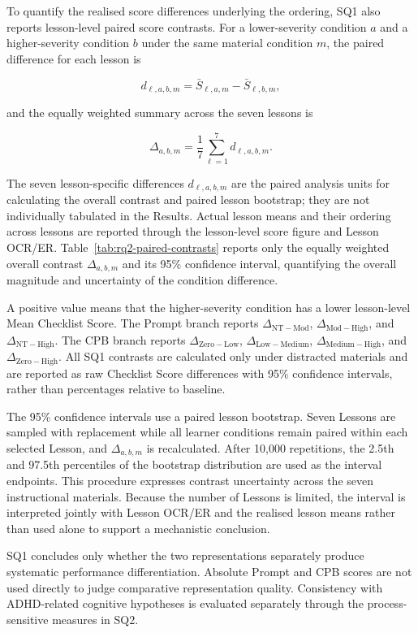 To quantify the realised score differences underlying the ordering, SQ1 also reports lesson-level paired score contrasts. For a lower-severity condition $a$ and a higher-severity condition $b$ under the same material condition $m$, the paired difference for each lesson is

\[
d_{\ell,a,b,m}
=
\bar S_{\ell,a,m}
-
\bar S_{\ell,b,m},
\]

and the equally weighted summary across the seven lessons is

\[
\Delta_{a,b,m}
=
\frac{1}{7}
\sum_{\ell=1}^{7}
d_{\ell,a,b,m}.
\]

The seven lesson-specific differences $d_{\ell,a,b,m}$ are the paired analysis units for calculating the overall contrast and paired lesson bootstrap; they are not individually tabulated in the Results. Actual lesson means and their ordering across lessons are reported through the lesson-level score figure and Lesson OCR/ER. Table~\ref{tab:rq2-paired-contrasts} reports only the equally weighted overall contrast $\Delta_{a,b,m}$ and its 95\% confidence interval, quantifying the overall magnitude and uncertainty of the condition difference.

A positive value means that the higher-severity condition has a lower lesson-level Mean Checklist Score. The Prompt branch reports $\Delta_{\mathrm{NT-Mod}}$, $\Delta_{\mathrm{Mod-High}}$, and $\Delta_{\mathrm{NT-High}}$. The CPB branch reports $\Delta_{\mathrm{Zero-Low}}$, $\Delta_{\mathrm{Low-Medium}}$, $\Delta_{\mathrm{Medium-High}}$, and $\Delta_{\mathrm{Zero-High}}$. All SQ1 contrasts are calculated only under distracted materials and are reported as raw Checklist Score differences with 95\% confidence intervals, rather than percentages relative to baseline.

The 95\% confidence intervals use a paired lesson bootstrap. Seven Lessons are sampled with replacement while all learner conditions remain paired within each selected Lesson, and $\Delta_{a,b,m}$ is recalculated. After 10,000 repetitions, the 2.5th and 97.5th percentiles of the bootstrap distribution are used as the interval endpoints. This procedure expresses contrast uncertainty across the seven instructional materials. Because the number of Lessons is limited, the interval is interpreted jointly with Lesson OCR/ER and the realised lesson means rather than used alone to support a mechanistic conclusion.

SQ1 concludes only whether the two representations separately produce systematic performance differentiation. Absolute Prompt and CPB scores are not used directly to judge comparative representation quality. Consistency with ADHD-related cognitive hypotheses is evaluated separately through the process-sensitive measures in SQ2.

